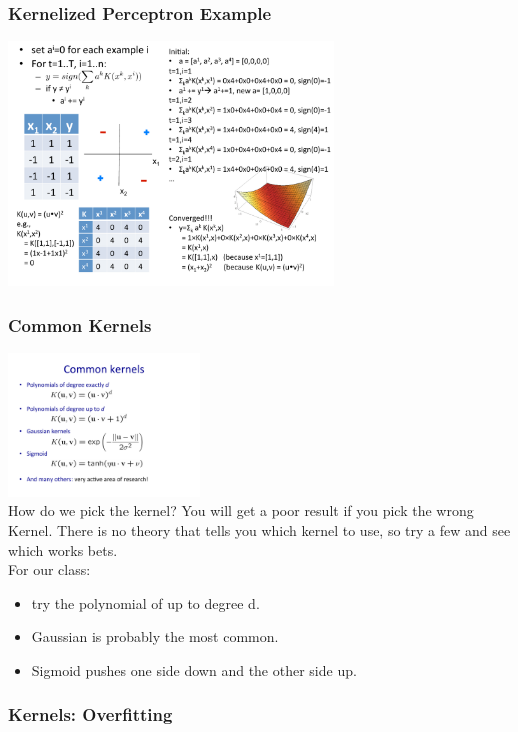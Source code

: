 \subsubsection{Kernelized Perceptron Example}

\includegraphics[width=3.4in]{figures/kernelized_perceptron_example.pdf}

\subsubsection{Common Kernels}

\includegraphics[width=2.0in]{figures/common_kernels.pdf} \hfill \\
How do we pick the kernel? 
You will get a poor result if you pick the wrong Kernel. 
There is no theory that tells you which kernel to use, so try a few and see which works bets.  \hfill \\

For our class:
\begin{itemize}
	\item try the polynomial of up to degree d.
    	\item Gaussian is probably the most common.
    	\item Sigmoid pushes one side down and the other side up.
\end{itemize}

\subsubsection{Kernels: Overfitting}

